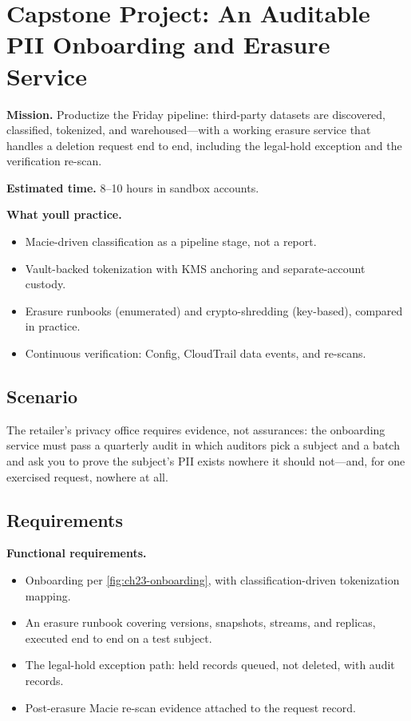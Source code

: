 \section{Capstone Project: An Auditable PII Onboarding and Erasure Service}\label{sec:ch23-capstone}

\begin{capstonebox}
\textbf{Mission.} Productize the Friday pipeline: third-party datasets are discovered, classified, tokenized, and warehoused---with a working erasure service that handles a deletion request end to end, including the legal-hold exception and the verification re-scan.

\textbf{Estimated time.} 8--10 hours in sandbox accounts.

\textbf{What you\textquotesingle{}ll practice.}
\begin{itemize}
    \item Macie-driven classification as a pipeline stage, not a report.
    \item Vault-backed tokenization with KMS anchoring and separate-account custody.
    \item Erasure runbooks (enumerated) and crypto-shredding (key-based), compared in practice.
    \item Continuous verification: Config, CloudTrail data events, and re-scans.
\end{itemize}
\end{capstonebox}

\subsection*{Scenario}
The retailer's privacy office requires evidence, not assurances: the onboarding service must pass a quarterly audit in which auditors pick a subject and a batch and ask you to prove the subject's PII exists nowhere it should not---and, for one exercised request, nowhere at all.

\subsection*{Requirements}
\textbf{Functional requirements.}
\begin{itemize}
    \item Onboarding per \cref{fig:ch23-onboarding}, with classification-driven tokenization mapping.
    \item An erasure runbook covering versions, snapshots, streams, and replicas, executed end to end on a test subject.
    \item The legal-hold exception path: held records queued, not deleted, with audit records.
    \item Post-erasure Macie re-scan evidence attached to the request record.
\end{itemize}

